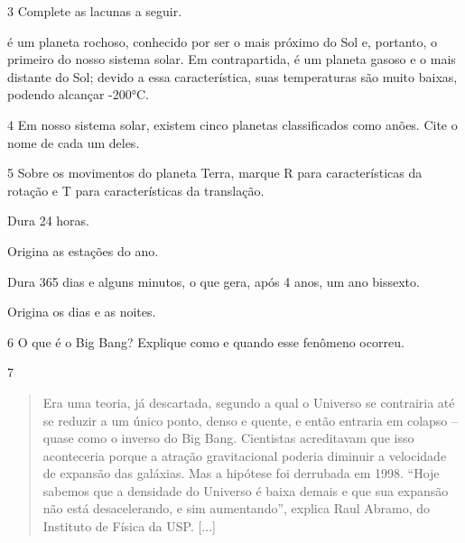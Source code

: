 \num{3}  Complete as lacunas a seguir.

 é um planeta rochoso, conhecido por ser
o mais próximo do Sol e, portanto, o primeiro do nosso sistema solar. Em
contrapartida,  é um planeta gasoso e o mais distante
do Sol; devido a essa característica, suas temperaturas são muito
baixas, podendo alcançar -200°C. 

\num{4}  Em nosso sistema solar, existem cinco planetas classificados como anões. Cite o nome de cada um deles.



\num{5}  Sobre os movimentos do planeta Terra, marque R para características da rotação e T para características da translação.

\begin{boxlist}
 Dura 24 horas.

 Origina as estações do ano.

 Dura 365 dias e alguns minutos, o que gera, após 4 anos, um ano
bissexto.

 Origina os dias e as noites.
\end{boxlist}

\pagebreak
\num{6}  O que é o Big Bang? Explique como e quando esse fenômeno ocorreu.



\num{7}

\begin{quote}
Era uma teoria, já descartada, segundo a qual o Universo se contrairia até
  se reduzir a um único ponto, denso e quente, e então entraria em
  colapso -- quase como o inverso do Big Bang. Cientistas acreditavam
  que isso aconteceria porque a atração gravitacional poderia diminuir a
  velocidade de expansão das galáxias. Mas a hipótese foi derrubada em
  1998. ``Hoje sabemos que a densidade do Universo é baixa demais e que
  sua expansão não está desacelerando, e sim aumentando'', explica Raul
  Abramo, do Instituto de Física da USP. [...]

\end{quote}


